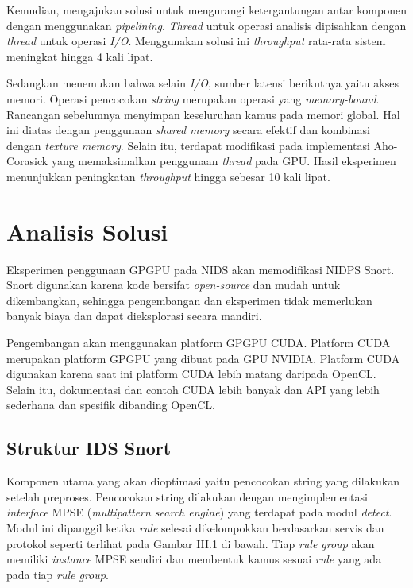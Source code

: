     Kemudian, \cite{kargus2012} mengajukan solusi untuk mengurangi ketergantungan antar komponen dengan menggunakan \emph{pipelining}. \emph{Thread} untuk operasi analisis dipisahkan dengan \emph{thread} untuk operasi \emph{I/O}. Menggunakan solusi ini \emph{throughput} rata-rata sistem meningkat hingga 4 kali lipat.

    Sedangkan \cite{lin2013} menemukan bahwa selain \emph{I/O}, sumber latensi berikutnya yaitu akses memori. Operasi pencocokan \emph{string} merupakan operasi yang \emph{memory-bound}. Rancangan sebelumnya menyimpan keseluruhan kamus pada memori global. Hal ini diatas dengan penggunaan \emph{shared memory} secara efektif dan kombinasi dengan \emph{texture memory}. Selain itu, terdapat modifikasi pada implementasi Aho-Corasick yang memaksimalkan penggunaan \emph{thread} pada GPU. Hasil eksperimen menunjukkan peningkatan \emph{throughput} hingga sebesar 10 kali lipat.

  \section{Analisis Solusi}

    Eksperimen penggunaan GPGPU pada NIDS akan memodifikasi NIDPS Snort. Snort digunakan karena kode bersifat \emph{open-source} dan mudah untuk dikembangkan, sehingga pengembangan dan eksperimen tidak memerlukan banyak biaya dan dapat dieksplorasi secara mandiri. 

    Pengembangan akan menggunakan platform GPGPU CUDA. Platform CUDA merupakan platform GPGPU yang dibuat pada GPU NVIDIA. Platform CUDA digunakan karena saat ini platform CUDA lebih matang daripada OpenCL. Selain itu, dokumentasi dan contoh CUDA lebih banyak dan API yang lebih sederhana dan spesifik dibanding OpenCL.

    \subsection{Struktur IDS Snort}

      Komponen utama yang akan dioptimasi yaitu pencocokan string yang dilakukan setelah preproses. Pencocokan string dilakukan dengan mengimplementasi \emph{interface} MPSE (\emph{multipattern search engine}) yang terdapat pada modul \emph{detect}. Modul ini dipanggil ketika \emph{rule} selesai dikelompokkan berdasarkan servis dan protokol seperti terlihat pada Gambar III.1 di bawah. Tiap \emph{rule group} akan memiliki \emph{instance} MPSE sendiri dan membentuk kamus sesuai \emph{rule} yang ada pada tiap \emph{rule group}.


